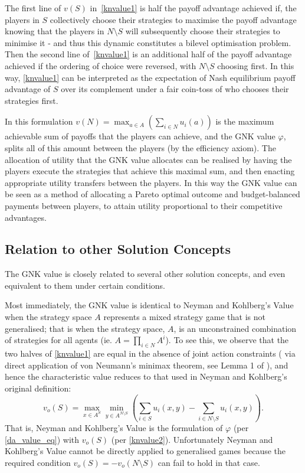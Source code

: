 The first line of $v(S)$ in~\eqref{knvalue1} is half the payoff advantage achieved if, the players in $S$ collectively choose their strategies to maximise the payoff advantage knowing that the players in $N\setminus S$ will subsequently choose their strategies to minimise it - and thus this dynamic constitutes a bilevel optimisation problem.
Then the second line of~\eqref{knvalue1} is an additional half of the payoff advantage achieved if the ordering of choice were reversed, with $N\setminus S$ choosing first.
In this way, \eqref{knvalue1} can be interpreted as the expectation of Nash equilibrium payoff advantage of $S$ over its complement under a fair coin-toss of who chooses their strategies first.

In this formulation $v(N) = \max_{a\in A} (\sum_{i\in N} u_i(a))$ is the maximum achievable sum of payoffs that the players can achieve, and the GNK value $\varphi$, splits all of this amount between the players (by the efficiency axiom).
The allocation of utility that the GNK value allocates can be realised by having the players execute the strategies that achieve this maximal sum, and then enacting appropriate utility transfers between the players.
In this way the GNK value can be seen as a method of allocating a Pareto optimal outcome and budget-balanced payments between players, to attain utility proportional to their competitive advantages.

\subsection{Relation to other Solution Concepts}\label{relating_to_the_old}

The GNK value is closely related to several other solution concepts, and even equivalent to them under certain conditions.

Most immediately, the GNK value is identical to Neyman and Kohlberg's Value \cite{value2} when the strategy space $A$ represents a mixed strategy game that is not generalised; that is when the strategy space, $A$, is an unconstrained combination of strategies for all agents (ie. $A = \prod_{i\in N}A^i$).
To see this, we observe that the two halves of \eqref{knvalue1} are equal in the absence of joint action constraints (%
via direct application of von Neumann's minimax theorem, see Lemma 1 of \cite{value2}), 
and hence the characteristic value reduces to that used in Neyman and Kohlberg's original definition:
\begin{equation}\label{knvalue2}v_o(S) = \max_{x\in A^S}\min_{y\in A^{N\setminus S}} \left(\sum_{i\in S} u_i(x,y) - \sum_{i\in N\setminus S} u_i(x,y) \right).\end{equation}
%
That is, Neyman and Kohlberg's Value is the formulation of $\varphi$ (per \eqref{da_value_eq}) 
with $v_o(S)$ (per \eqref{knvalue2}).
Unfortunately Neyman and Kohlberg's Value cannot be directly applied to generalised games because the required condition $v_o(S)=-v_o(N\setminus S)$ can fail to hold in that case. 

